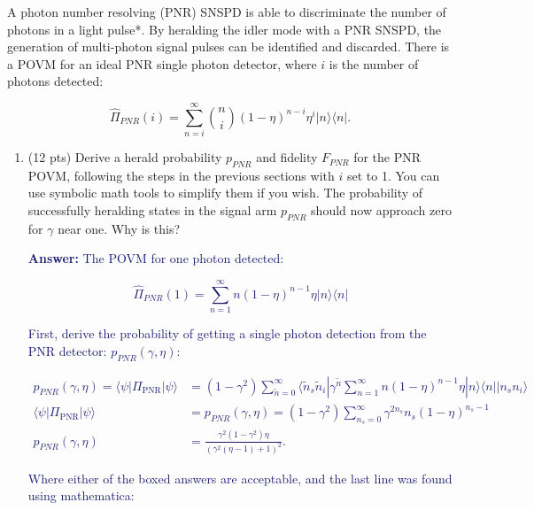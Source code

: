 \documentclass[11pt]{caltech_thesis} %
\begin{document}
A photon number resolving (PNR) SNSPD is able to discriminate the number of photons in a light pulse*. By heralding the idler mode with a PNR SNSPD, the generation of multi-photon signal pulses can be identified and discarded. There is a POVM for an ideal PNR single photon detector, where $i$ is the number of photons detected:

$$\hat{\Pi}_{PNR}(i)=\sum_{n=i}^{\infty}\binom{n}{i}(1-\eta)^{n-i} \eta^{i}|n\rangle\langle n|.$$

\begin{enumerate}
\def\labelenumi{\arabic{enumi}.}
\setcounter{enumi}{3}
\item
  (12 pts) Derive a herald probability $p_{PNR}$ and fidelity $F_{PNR}$ for the PNR POVM, following the steps in the previous sections with $i$ set to 1. You can use symbolic math tools to simplify them if you wish. The probability of successfully heralding states in the signal arm $p_{PNR}$ should now approach zero for $\gamma$ near one. Why is this?

  \textcolor{midnightblue}{ \textbf{Answer:} }
  \textcolor{midnightblue}{The POVM for one photon detected:}

  \textcolor{midnightblue}{

  $$\hat{\Pi}_{PNR}(1)=\sum_{n=1}^{\infty}n(1-\eta)^{n-1} \eta|n\rangle\langle n|$$

  }

  \textcolor{midnightblue}{First, derive the probability of getting a single photon detection from the PNR detector: $p_{PNR}(\gamma, \eta)$:}

  \textcolor{midnightblue}{

  $$\begin{aligned}
       p_{PNR}(\gamma, \eta) =\langle \psi | \Pi_{\text {PNR}} | \psi \rangle &= (1- \gamma^2) \sum_{\tilde{n}=0}^{\infty} \langle \tilde{n}_s \tilde{n}_i | \gamma^{\tilde{n}} \sum_{n=1}^{\infty}n(1-\eta)^{n-1} \eta|n\rangle\langle n| | n_s n_i \rangle \\
       \langle \psi | \Pi_{\text {PNR}} | \psi \rangle &= p_{PNR}\left(\gamma, \eta\right) =  \boxed{(1-\gamma^2) \sum_{n_s=0}^{\infty} \gamma^{2n_s} n_s(1-\eta)^{n_s-1}}\\
       p_{PNR}\left(\gamma, \eta\right) &=  \boxed{\frac{\gamma ^2 (1 - \gamma ^2) \eta }{(\gamma ^2 (\eta -1)+1)^2}}.
   \end{aligned}$$

  }

  \textcolor{midnightblue}{Where either of the boxed answers are acceptable, and the last line was found using mathematica:}


\end{enumerate}
\end{document}
